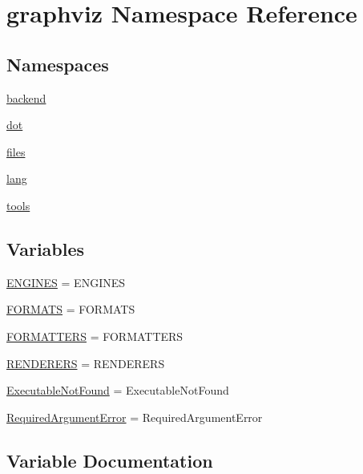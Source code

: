 \hypertarget{namespacegraphviz}{}\section{graphviz Namespace Reference}
\label{namespacegraphviz}
\subsection*{Namespaces}
\begin{DoxyCompactItemize}
\item 
 \hyperlink{namespacegraphviz_1_1backend}{backend}
\item 
 \hyperlink{namespacegraphviz_1_1dot}{dot}
\item 
 \hyperlink{namespacegraphviz_1_1files}{files}
\item 
 \hyperlink{namespacegraphviz_1_1lang}{lang}
\item 
 \hyperlink{namespacegraphviz_1_1tools}{tools}
\end{DoxyCompactItemize}
\subsection*{Variables}
\begin{DoxyCompactItemize}
\item 
\hyperlink{namespacegraphviz_ad6098d40fefdce1124ba066a2d03b5d9}{E\+N\+G\+I\+N\+ES} = E\+N\+G\+I\+N\+ES
\item 
\hyperlink{namespacegraphviz_af97936c02ddd58ea6608447cabe9661b}{F\+O\+R\+M\+A\+TS} = F\+O\+R\+M\+A\+TS
\item 
\hyperlink{namespacegraphviz_a5f85aa7d9e9aaebc186236b2f627f02c}{F\+O\+R\+M\+A\+T\+T\+E\+RS} = F\+O\+R\+M\+A\+T\+T\+E\+RS
\item 
\hyperlink{namespacegraphviz_adf6e44b05987a0b045c3977928febee9}{R\+E\+N\+D\+E\+R\+E\+RS} = R\+E\+N\+D\+E\+R\+E\+RS
\item 
\hyperlink{namespacegraphviz_aa84862b7d9c9f008e138ed79492843c8}{Executable\+Not\+Found} = Executable\+Not\+Found
\item 
\hyperlink{namespacegraphviz_a907ef4565e438e1306385930a4032577}{Required\+Argument\+Error} = Required\+Argument\+Error
\end{DoxyCompactItemize}


\subsection{Variable Documentation}
\mbox{\label{namespacegraphviz_ad6098d40fefdce1124ba066a2d03b5d9}} 
